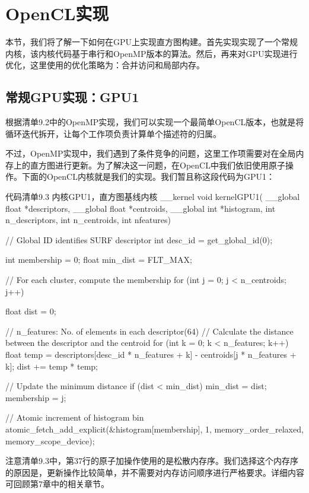 \section{OpenCL实现}

本节，我们将了解一下如何在GPU上实现直方图构建。首先实现实现了一个常规内核，该内核代码基于串行和OpenMP版本的算法。然后，再来对GPU实现进行优化，这里使用的优化策略为：合并访问和局部内存。

\subsection{常规GPU实现：GPU1}

根据清单9.2中的OpenMP实现，我们可以实现一个最简单OpenCL版本，也就是将循环迭代拆开，让每个工作项负责计算单个描述符的归属。

不过，OpenMP实现中，我们遇到了条件竞争的问题，这里工作项需要对在全局内存上的直方图进行更新。为了解决这一问题，在OpenCL中我们依旧使用原子操作。下面的OpenCL内核就是我们的实现。我们暂且称这段代码为GPU1：

\begin{codeboxt}[cpp]{代码清单9.3 内核GPU1，直方图基线内核}
__kernel
void kernelGPU1(
  __global float *descriptors,
  __global float *centroids,
  __global int *histogram,
  int n_descriptors,
  int n_centroids,
  int nfeatures){

  // Global ID identifies SURF descriptor
  int desc_id = get_global_id(0);

  int membership = 0;
  float min_dist = FLT_MAX;

  // For each cluster, compute the membership
  for (int j = 0; j < n_centroids; j++){
    float dist = 0;

    // n_features: No. of elements in each descriptor(64)
    // Calculate the distance between the descriptor and the centroid
    for (int k = 0; k < n_features; k++){
      float temp = descriptors[desc_id * n_features + k] -
        centroids[j * n_features + k];
      dist += temp * temp;
    }

    // Update the minimum distance
    if (dist < min_dist){
      min_dist = dist;
      membership = j;
    }
  }

  // Atomic increment of histogram bin
  atomic_fetch_add_explicit(&histogram[membership], 1, memory_order_relaxed, memory_scope_device);
}
\end{codeboxt}

注意清单9.3中，第37行的原子加操作使用的是松散内存序。我们选择这个内存序的原因是，更新操作比较简单，并不需要对内存访问顺序进行严格要求。详细内容可回顾第7章中的相关章节。

